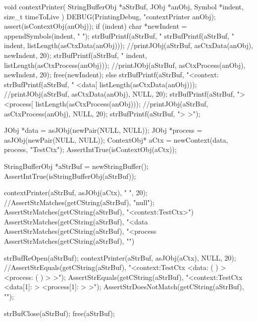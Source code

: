 \startCCode
void contextPrinter(
  StringBufferObj *aStrBuf,
  JObj            *anObj,
  Symbol          *indent,
  size_t           timeToLive
) {
  DEBUG(PrintingDebug, "contextPrinter %
  anObj);
  assert(isContextObj(anObj));
  if (indent) {
    char *newIndent = appendSymbols(indent, "    ");
    strBufPrintf(aStrBuf, "%
    strBufPrintf(aStrBuf, "%
      indent, listLength(asCtxData(anObj)));
    //printJObj(aStrBuf, asCtxData(anObj), newIndent, 20);
    strBufPrintf(aStrBuf, "%
      indent, listLength(asCtxProcess(anObj)));
    //printJObj(aStrBuf, asCtxProcess(anObj), newIndent, 20);
    free(newIndent);
  } else {
    strBufPrintf(aStrBuf, "<context:%
    strBufPrintf(aStrBuf, "  <data[%
      listLength(asCtxData(anObj)));
    //printJObj(aStrBuf, asCtxData(anObj), NULL, 20);
    strBufPrintf(aStrBuf, "> <process[%
      listLength(asCtxProcess(anObj)));
    //printJObj(aStrBuf, asCtxProcess(anObj), NULL, 20);
    strBufPrintf(aStrBuf, "> >");
  }
}
\stopCCode


\startCTest
  JObj *data       = asJObj(newPair(NULL, NULL));
  JObj *process    = asJObj(newPair(NULL, NULL));
  ContextObj* aCtx = newContext(data, process, "TestCtx");
  AssertIntTrue(isContextObj(aCtx));
  
  StringBufferObj *aStrBuf = newStringBuffer();
  AssertIntTrue(isStringBufferObj(aStrBuf));
  
  contextPrinter(aStrBuf, asJObj(aCtx), "  ", 20);
  //AssertStrMatches(getCString(aStrBuf), "null");
  AssertStrMatches(getCString(aStrBuf), "<context:TestCtx>")
  AssertStrMatches(getCString(aStrBuf), "<data%
  AssertStrMatches(getCString(aStrBuf), "<process%
  AssertStrMatches(getCString(aStrBuf), "\n")

  strBufReOpen(aStrBuf);
  contextPrinter(aStrBuf, asJObj(aCtx), NULL, 20);
  //AssertStrEquals(getCString(aStrBuf), "<context:TestCtx   <data: (  )  > <process: (  )  > >");
  AssertStrEquals(getCString(aStrBuf), "<context:TestCtx   <data[1]: > <process[1]: > >");
  AssertStrDoesNotMatch(getCString(aStrBuf), "\n");
  
  strBufClose(aStrBuf);
  free(aStrBuf);
\stopCTest
\stopTestCase
\stopTestSuite